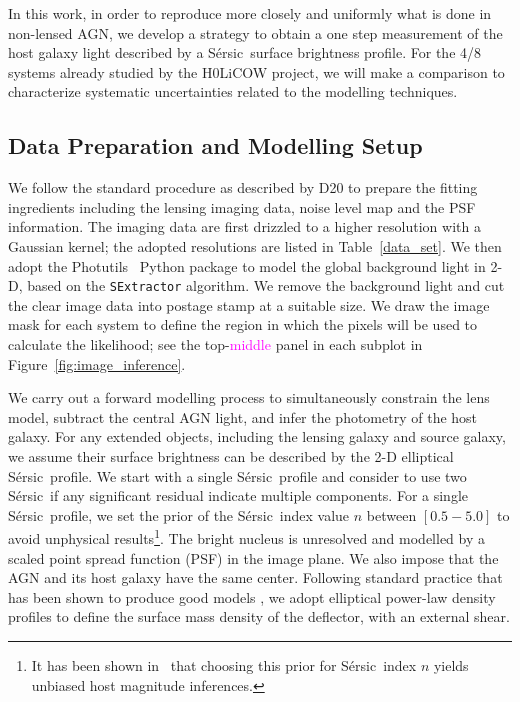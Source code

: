 \documentclass[fleqn,usenatbib]{mnras}
\newcommand{\sersic}{S\'ersic}
\newcommand{\pink}[1]{{\textcolor{magenta}{#1}}}
\begin{document}
In this work, in order to reproduce more closely and uniformly what is
done in non-lensed AGN, we develop a strategy to obtain a one step
measurement of the host galaxy light described by a \sersic\ surface
brightness profile. For the 4/8 systems already studied by the H0LiCOW
project, we will make a comparison to characterize systematic
uncertainties related to the modelling techniques.

\subsection{Data Preparation and Modelling Setup}

We follow the standard procedure as described by D20 to prepare the fitting ingredients including the lensing imaging data, noise level map and the PSF information. The imaging data are first drizzled to a higher resolution with a Gaussian kernel; the adopted resolutions are listed in Table~\ref{data_set}. We then adopt the {\sc Photutils}~\citep{photutils} Python package to model the global background light in 2-D, based on the \texttt{SExtractor} algorithm. We remove the background light and cut the clear image data into postage stamp at a suitable size. We draw the image mask for each system to define the region in which the pixels will be used to calculate the likelihood; see the top-\pink{middle} panel in each subplot in Figure~\ref{fig:image_inference}.

We carry out a forward modelling process to simultaneously constrain the lens model, subtract the central AGN light, and infer the photometry of the host galaxy. For any extended objects, including the lensing galaxy and source galaxy, we assume their surface brightness can be described by the 2-D elliptical \sersic\ profile. We start with a single \sersic\ profile and consider to use two \sersic\ if any significant residual indicate multiple components. For a single \sersic\ profile, we set the prior of the \sersic\ index value $n$ between $[0.5-5.0]$ to avoid unphysical results\footnote{It has been shown in~\citet{Ding2017a} that choosing this prior for \sersic\ index $n$ yields unbiased host magnitude inferences.}. The bright nucleus is unresolved and modelled by a scaled point spread function (PSF) in the image plane. We also impose that the AGN and its host galaxy have the same center. Following standard practice that has been shown to produce good models \citep[e.g.,][and references therein]{Treu2010}, we adopt elliptical power-law density profiles to define the surface mass density of the deflector, with an external shear.
\end{document}
